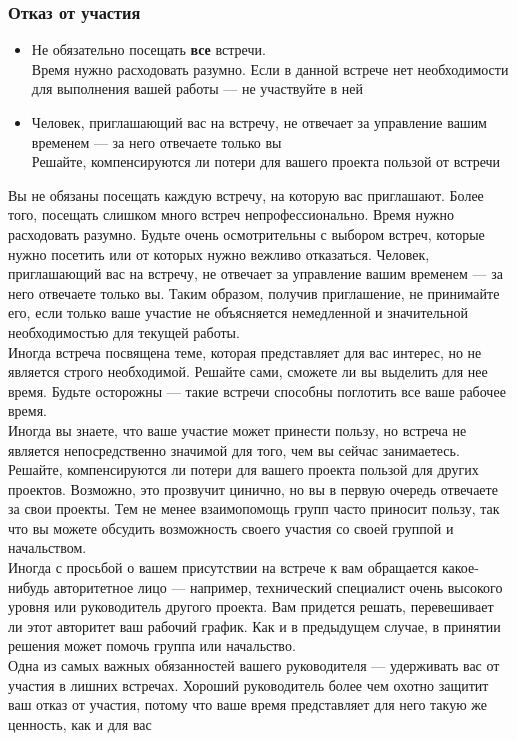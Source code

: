 \documentclass{../industrial-development}
\begin{document}
\begin{frame} \frametitle{Отказ от участия}
\begin{itemize}
  \item Не обязательно посещать \textbf{все} встречи.\\
	Время нужно расходовать разумно. Если в данной встрече нет необходимости для выполнения вашей работы --- не участвуйте в ней
  \item Человек, приглашающий вас на встречу, не отвечает за управление вашим временем — за него отвечаете только вы\\
	Решайте, компенсируются ли потери для вашего проекта пользой от встречи
\end{itemize}
\end{frame}
\lecturenotes
Вы не обязаны посещать каждую встречу, на которую вас приглашают. Более того, посещать слишком много встреч непрофессионально. Время нужно расходовать разумно. Будьте очень осмотрительны с выбором встреч, которые нужно посетить или от которых нужно вежливо отказаться. Человек, приглашающий вас на встречу, не отвечает за управление вашим временем — за него отвечаете только вы. Таким образом, получив приглашение, не принимайте его, если только ваше участие не объясняется немедленной и значительной необходимостью для текущей работы.\\
Иногда встреча посвящена теме, которая представляет для вас интерес, но не является строго необходимой. Решайте сами, сможете ли вы выделить для нее время. Будьте осторожны — такие встречи способны поглотить все ваше рабочее время.\\
Иногда вы знаете, что ваше участие может принести пользу, но встреча не является непосредственно значимой для того, чем вы сейчас занимаетесь. Решайте, компенсируются ли потери для вашего проекта пользой для других проектов. Возможно, это прозвучит цинично, но вы в первую очередь отвечаете за свои проекты. Тем не менее взаимопомощь групп часто приносит пользу, так что вы можете обсудить возможность своего участия со своей группой и начальством.\\
Иногда с просьбой о вашем присутствии на встрече к вам обращается какое-нибудь авторитетное лицо — например, технический специалист очень высокого уровня или руководитель другого проекта. Вам придется решать, перевешивает ли этот авторитет ваш рабочий график. Как и в предыдущем случае, в принятии решения может помочь группа или начальство.\\
Одна из самых важных обязанностей вашего руководителя — удерживать вас от участия в лишних встречах. Хороший руководитель более чем охотно защитит ваш отказ от участия, потому что ваше время представляет для него такую же ценность, как и для вас
\end{document}
